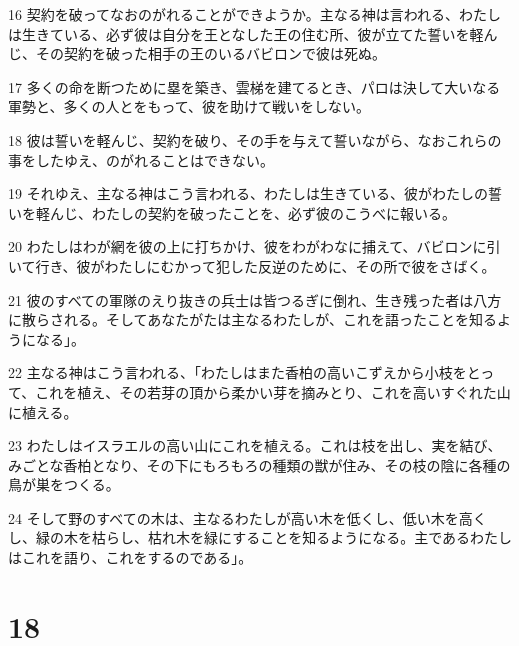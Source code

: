 \par 16 契約を破ってなおのがれることができようか。主なる神は言われる、わたしは生きている、必ず彼は自分を王となした王の住む所、彼が立てた誓いを軽んじ、その契約を破った相手の王のいるバビロンで彼は死ぬ。
\par 17 多くの命を断つために塁を築き、雲梯を建てるとき、パロは決して大いなる軍勢と、多くの人とをもって、彼を助けて戦いをしない。
\par 18 彼は誓いを軽んじ、契約を破り、その手を与えて誓いながら、なおこれらの事をしたゆえ、のがれることはできない。
\par 19 それゆえ、主なる神はこう言われる、わたしは生きている、彼がわたしの誓いを軽んじ、わたしの契約を破ったことを、必ず彼のこうべに報いる。
\par 20 わたしはわが網を彼の上に打ちかけ、彼をわがわなに捕えて、バビロンに引いて行き、彼がわたしにむかって犯した反逆のために、その所で彼をさばく。
\par 21 彼のすべての軍隊のえり抜きの兵士は皆つるぎに倒れ、生き残った者は八方に散らされる。そしてあなたがたは主なるわたしが、これを語ったことを知るようになる」。
\par 22 主なる神はこう言われる、「わたしはまた香柏の高いこずえから小枝をとって、これを植え、その若芽の頂から柔かい芽を摘みとり、これを高いすぐれた山に植える。
\par 23 わたしはイスラエルの高い山にこれを植える。これは枝を出し、実を結び、みごとな香柏となり、その下にもろもろの種類の獣が住み、その枝の陰に各種の鳥が巣をつくる。
\par 24 そして野のすべての木は、主なるわたしが高い木を低くし、低い木を高くし、緑の木を枯らし、枯れ木を緑にすることを知るようになる。主であるわたしはこれを語り、これをするのである」。

\chapter{18}

